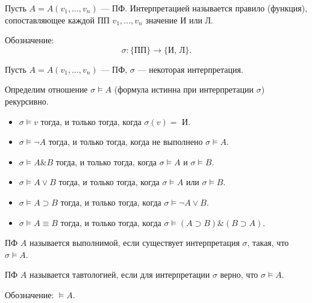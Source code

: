     \begin{Def}[Интерпретация]
        Пусть $A = A(v_1, ..., v_n)$ --- ПФ. Интерпретацией называется правило (функция), сопоставляющее каждой ПП $v_1, ..., v_n$ значение И или Л.
    \end{Def}

    \begin{Rem}
        Обозначение:
        $$\sigma: \{ \text{ПП} \} \rightarrow \{ \text{И, Л} \}.$$
    \end{Rem}

    \begin{Def}
        Пусть $A = A(v_1, ..., v_n)$ --- ПФ, $\sigma$ --- некоторая интерпретация.

        Определим отношение $\sigma \models A$ (формула истинна при интерпретации $\sigma$) рекурсивно.
        \begin{itemize}
            \item $\sigma \models v$ тогда, и только тогда, когда $\sigma(v) =$ И.
            \item $\sigma \models \neg A$ тогда, и только тогда, когда не выполнено $\sigma \models A$.
            \item $\sigma \models A \& B$ тогда, и только тогда, когда $\sigma \models A$ и $\sigma \models B$.
            \item $\sigma \models A \vee B$ тогда, и только тогда, когда $\sigma \models A$ или $\sigma \models B$.
            \item $\sigma \models A \supset B$ тогда, и только тогда, когда $\sigma \models \neg A \vee B$.
            \item $\sigma \models A \equiv B$ тогда, и только тогда, когда $\sigma \models (A \supset B) \& (B \supset A)$.
        \end{itemize}
    \end{Def}

    \begin{Def}[Выполнимая ПФ]
        ПФ $A$ называется выполнимой, если существует интерпретация $\sigma$, такая, что $\sigma \models A$.
    \end{Def}

    \begin{Def}[Тавтология]
        ПФ $A$ называется тавтологией, если для интерпретации $\sigma$ верно, что $\sigma \models A$.
    \end{Def}

    \begin{Rem}
        Обозначение: $\models A$.
    \end{Rem}

